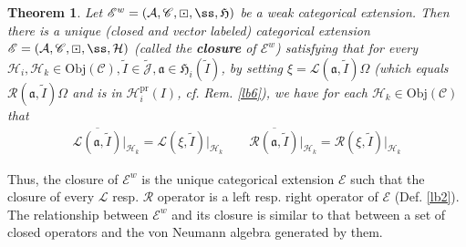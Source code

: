 \documentclass[11pt,b5paper,notitlepage]{article}
\theoremstyle{definition}
\theoremstyle{plain}
\newtheorem{thm}[df]{Theorem}
\newcommand{\fk}{\mathfrak}
\newcommand{\mc}{\mathcal}
\newcommand{\wtd}{\widetilde}
\newcommand{\ovl}{\overline}
\newcommand{\scr}{\mathscr}
\newcommand{\Jtd}{\widetilde{\mathcal J}}
\newcommand{\pr}{\mathrm {pr}}
\newcommand{\Obj}{\mathrm{Obj}}
\numberwithin{equation}{section}
\begin{document}
\begin{thm}\label{lb16}
Let $\scr E^w=(\mc A,\scr C,\boxdot,\ss,\fk H)$ be a weak categorical extension. Then there is a unique (closed and vector labeled) categorical extension $\scr E=(\mc A,\scr C,\boxdot,\ss,\mc H)$ (called the \textbf{closure} of $\scr E^w$) satisfying that for every $\mc H_i,\mc H_k\in\Obj(\scr C),\wtd I\in\Jtd,\fk a\in\fk H_i(\wtd I)$, by setting $\xi=\mc L(\fk a,\wtd I)\Omega$ (which equals $\mc R(\fk a,\wtd I)\Omega$ and is in $\mc H_i^\pr(I)$, cf. Rem. \ref{lb6}), we have for each $\mc H_k\in\Obj(\scr C)$ that
\begin{align}
\ovl{\mc L(\fk a,\wtd I)}\big|_{\mc H_k}=\scr L(\xi,\wtd I)\big|_{\mc H_k}\qquad \ovl{\mc R(\fk a,\wtd I)}\big|_{\mc H_k}=\scr R(\xi,\wtd I)\big|_{\mc H_k}
\end{align}
\end{thm}

Thus, the closure of $\scr E^w$ is the unique categorical extension $\scr E$ such that the closure of every $\mc L$ resp. $\mc R$ operator is a left resp. right operator of $\scr E$ (Def. \ref{lb2}). The relationship between $\scr E^w$ and its closure is similar to that between a set of closed operators and the von Neumann algebra generated by them.
\end{document}
